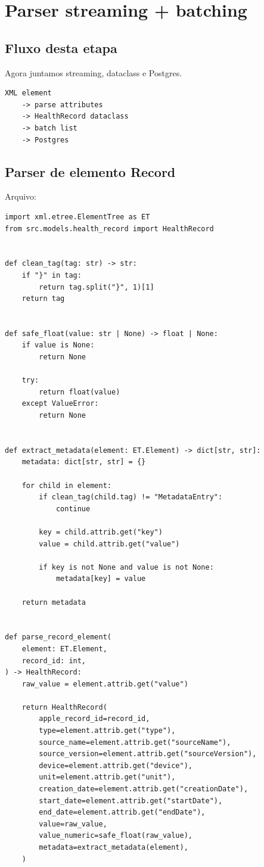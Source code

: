 \chapter{Parser streaming + batching}

\section{Fluxo desta etapa}

Agora juntamos streaming, dataclass e Postgres.

\begin{verbatim}
XML element
    -> parse attributes
    -> HealthRecord dataclass
    -> batch list
    -> Postgres
\end{verbatim}

\section{Parser de elemento Record}

Arquivo: 

\begin{lstlisting}[style=devbutterpython]
import xml.etree.ElementTree as ET
from src.models.health_record import HealthRecord


def clean_tag(tag: str) -> str:
    if "}" in tag:
        return tag.split("}", 1)[1]
    return tag


def safe_float(value: str | None) -> float | None:
    if value is None:
        return None

    try:
        return float(value)
    except ValueError:
        return None


def extract_metadata(element: ET.Element) -> dict[str, str]:
    metadata: dict[str, str] = {}

    for child in element:
        if clean_tag(child.tag) != "MetadataEntry":
            continue

        key = child.attrib.get("key")
        value = child.attrib.get("value")

        if key is not None and value is not None:
            metadata[key] = value

    return metadata


def parse_record_element(
    element: ET.Element,
    record_id: int,
) -> HealthRecord:
    raw_value = element.attrib.get("value")

    return HealthRecord(
        apple_record_id=record_id,
        type=element.attrib.get("type"),
        source_name=element.attrib.get("sourceName"),
        source_version=element.attrib.get("sourceVersion"),
        device=element.attrib.get("device"),
        unit=element.attrib.get("unit"),
        creation_date=element.attrib.get("creationDate"),
        start_date=element.attrib.get("startDate"),
        end_date=element.attrib.get("endDate"),
        value=raw_value,
        value_numeric=safe_float(raw_value),
        metadata=extract_metadata(element),
    )
\end{lstlisting}


